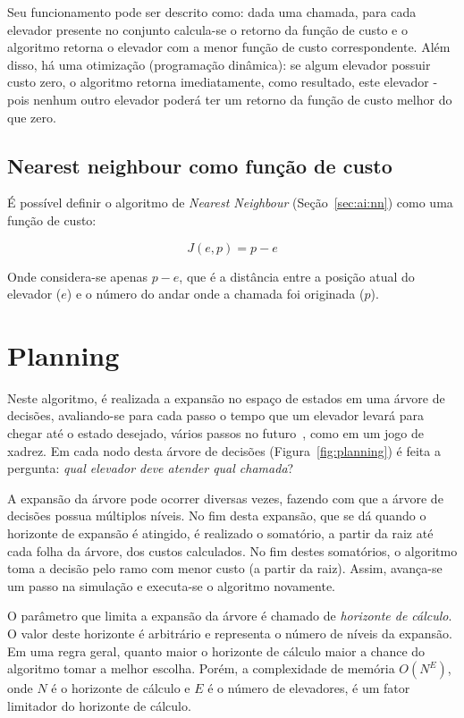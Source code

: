 Seu funcionamento pode ser descrito como: dada uma chamada, para cada elevador
presente no conjunto calcula-se o retorno da função de custo e o algoritmo
retorna o elevador com a menor função de custo correspondente. Além disso, há
uma otimização (programação dinâmica): se algum elevador possuir custo zero, o
algoritmo retorna imediatamente, como resultado, este elevador - pois nenhum
outro elevador poderá ter um retorno da função de custo melhor do que zero.

\subsection{Nearest neighbour como função de custo}

É possível definir o algoritmo de \textit{Nearest Neighbour}
(Seção~\ref{sec:ai:nn}) como uma função de custo:

\[J(e, p) = p - e\]

Onde considera-se apenas $p - e$, que é a distância entre a posição atual do
elevador ($e$) e o número do andar onde a chamada foi originada ($p$).

\section{\label{sec:ai:planning}Planning}

Neste algoritmo, é realizada a expansão no espaço de estados em uma árvore de
decisões, avaliando-se para cada passo o tempo que um elevador levará para
chegar até o estado desejado, vários passos no
futuro~\cite{Koehler00elevatorcontrol}, como em um jogo de xadrez. Em cada nodo
desta árvore de decisões (Figura~\ref{fig:planning}) é feita a pergunta:
\textit{qual elevador deve atender qual chamada}?

A expansão da árvore pode ocorrer diversas vezes, fazendo com que a árvore de
decisões possua múltiplos níveis. No fim desta expansão, que se dá quando
o horizonte de expansão é atingido, é realizado o somatório, a partir da raiz até
cada folha da árvore, dos custos calculados. No fim destes somatórios, o
algoritmo toma a decisão pelo ramo com menor custo (a partir da raiz). Assim,
avança-se um passo na simulação e executa-se o algoritmo novamente.

O parâmetro que limita a expansão da árvore é chamado de \textit{horizonte de
cálculo}. O valor deste horizonte é arbitrário e representa o número de níveis
da expansão. Em uma regra geral, quanto maior o horizonte de cálculo maior a
chance do algoritmo tomar a melhor escolha. Porém, a complexidade de memória
$O(N^{E})$, onde $N$ é o horizonte de cálculo e $E$ é o número de elevadores,
é um fator limitador do horizonte de cálculo.

